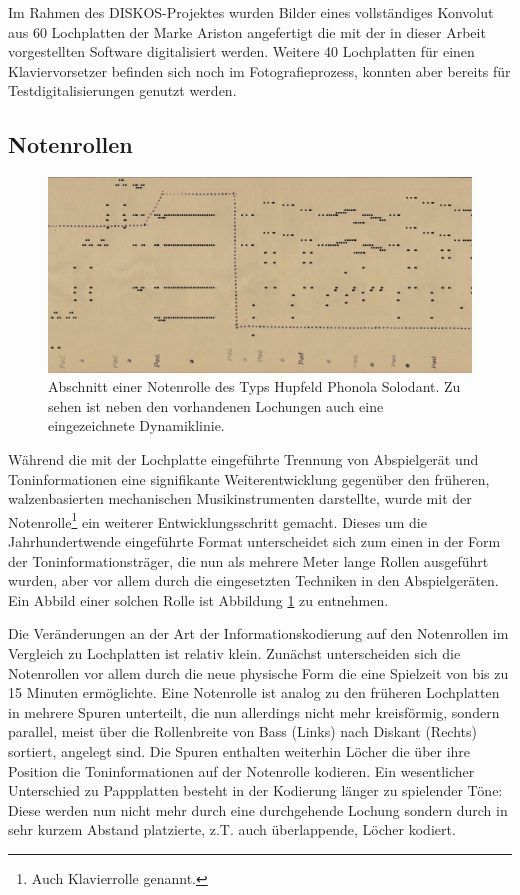 Im Rahmen des DISKOS-Projektes wurden Bilder eines vollständiges Konvolut aus 60 Lochplatten der Marke Ariston angefertigt die mit der in dieser Arbeit vorgestellten Software digitalisiert werden.
Weitere 40 Lochplatten für einen Klaviervorsetzer befinden sich noch im Fotografieprozess, konnten aber bereits für Testdigitalisierungen genutzt werden.

\subsection{Notenrollen}

\begin{figure}[t]
    \centering
    \includegraphics[width=\textwidth]{graphics/pianoroll.png}
    \caption{Abschnitt einer Notenrolle des Typs Hupfeld Phonola Solodant. Zu sehen ist neben den vorhandenen Lochungen auch eine eingezeichnete Dynamiklinie.}
    \label{pianoroll}
\end{figure}

Während die mit der Lochplatte eingeführte Trennung von Abspielgerät und Toninformationen eine signifikante Weiterentwicklung gegenüber den früheren, walzenbasierten mechanischen Musikinstrumenten darstellte, wurde mit der Notenrolle\footnote{Auch Klavierrolle genannt.} ein weiterer Entwicklungsschritt gemacht.
Dieses um die Jahrhundertwende eingeführte Format unterscheidet sich zum einen in der Form der Toninformationsträger, die nun als mehrere Meter lange Rollen ausgeführt wurden, aber vor allem durch die eingesetzten Techniken in den Abspielgeräten.
Ein Abbild einer solchen Rolle ist Abbildung \ref{pianoroll} zu entnehmen.

Die Veränderungen an der Art der Informationskodierung auf den Notenrollen im Vergleich zu Lochplatten ist relativ klein.
Zunächst unterscheiden sich die Notenrollen vor allem durch die neue physische Form die eine Spielzeit von bis zu 15 Minuten ermöglichte.
Eine Notenrolle ist analog zu den früheren Lochplatten in mehrere Spuren unterteilt, die nun allerdings nicht mehr kreisförmig, sondern parallel, meist über die Rollenbreite von Bass (Links) nach Diskant (Rechts) sortiert, angelegt sind.
Die Spuren enthalten weiterhin Löcher die über ihre Position die Toninformationen auf der Notenrolle kodieren.
Ein wesentlicher Unterschied zu Pappplatten besteht in der Kodierung länger zu spielender Töne: Diese werden nun nicht mehr durch eine durchgehende Lochung sondern durch in sehr kurzem Abstand platzierte, z.T. auch überlappende, Löcher kodiert.

